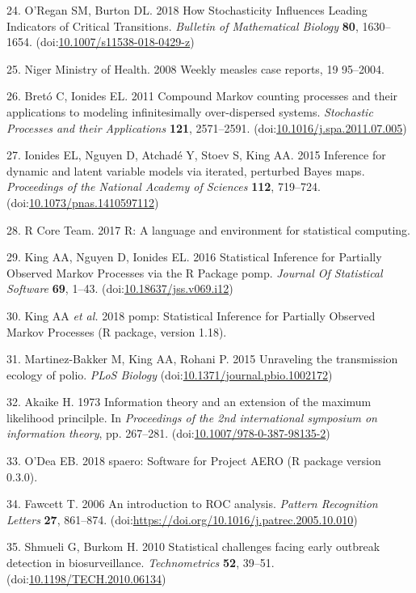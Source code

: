 \documentclass[3p]{elsarticle} %
\begin{document}
\leavevmode\hypertarget{ref-ORegan2018}{}%
24. O'Regan SM, Burton DL. 2018 How Stochasticity Influences Leading
Indicators of Critical Transitions. \emph{Bulletin of Mathematical
Biology} \textbf{80}, 1630--1654.
(doi:\href{https://doi.org/10.1007/s11538-018-0429-z}{10.1007/s11538-018-0429-z})

\leavevmode\hypertarget{ref-NigerMinistryofHealth2008}{}%
25. Niger Ministry of Health. 2008 Weekly measles case reports, 19
95--2004.

\leavevmode\hypertarget{ref-Breto2011}{}%
26. Bretó C, Ionides EL. 2011 Compound Markov counting processes and
their applications to modeling infinitesimally over-dispersed systems.
\emph{Stochastic Processes and their Applications} \textbf{121},
2571--2591.
(doi:\href{https://doi.org/10.1016/j.spa.2011.07.005}{10.1016/j.spa.2011.07.005})

\leavevmode\hypertarget{ref-Ionides2015}{}%
27. Ionides EL, Nguyen D, Atchadé Y, Stoev S, King AA. 2015 Inference
for dynamic and latent variable models via iterated, perturbed Bayes
maps. \emph{Proceedings of the National Academy of Sciences}
\textbf{112}, 719--724.
(doi:\href{https://doi.org/10.1073/pnas.1410597112}{10.1073/pnas.1410597112})

\leavevmode\hypertarget{ref-R2017}{}%
28. R Core Team. 2017 R: A language and environment for statistical
computing.

\leavevmode\hypertarget{ref-King2016}{}%
29. King AA, Nguyen D, Ionides EL. 2016 Statistical Inference for
Partially Observed Markov Processes via the R Package pomp.
\emph{Journal Of Statistical Software} \textbf{69}, 1--43.
(doi:\href{https://doi.org/10.18637/jss.v069.i12}{10.18637/jss.v069.i12})

\leavevmode\hypertarget{ref-King2018}{}%
30. King AA \emph{et al.} 2018 pomp: Statistical Inference for Partially
Observed Markov Processes (R package, version 1.18).

\leavevmode\hypertarget{ref-Martinez-Bakker2015}{}%
31. Martinez-Bakker M, King AA, Rohani P. 2015 Unraveling the
transmission ecology of polio. \emph{PLoS Biology}
(doi:\href{https://doi.org/10.1371/journal.pbio.1002172}{10.1371/journal.pbio.1002172})

\leavevmode\hypertarget{ref-Akaike1973}{}%
32. Akaike H. 1973 Information theory and an extension of the maximum
likelihood princilple. In \emph{Proceedings of the 2nd international
symposium on information theory}, pp. 267--281.
(doi:\href{https://doi.org/10.1007/978-0-387-98135-2}{10.1007/978-0-387-98135-2})

\leavevmode\hypertarget{ref-ODea2018}{}%
33. O'Dea EB. 2018 spaero: Software for Project AERO (R package version
0.3.0).

\leavevmode\hypertarget{ref-Fawcett2006}{}%
34. Fawcett T. 2006 An introduction to ROC analysis. \emph{Pattern
Recognition Letters} \textbf{27}, 861--874.
(doi:\href{https://doi.org/https://doi.org/10.1016/j.patrec.2005.10.010}{https://doi.org/10.1016/j.patrec.2005.10.010})

\leavevmode\hypertarget{ref-Shmueli2010}{}%
35. Shmueli G, Burkom H. 2010 Statistical challenges facing early
outbreak detection in biosurveillance. \emph{Technometrics} \textbf{52},
39--51.
(doi:\href{https://doi.org/10.1198/TECH.2010.06134}{10.1198/TECH.2010.06134})
\end{document}

